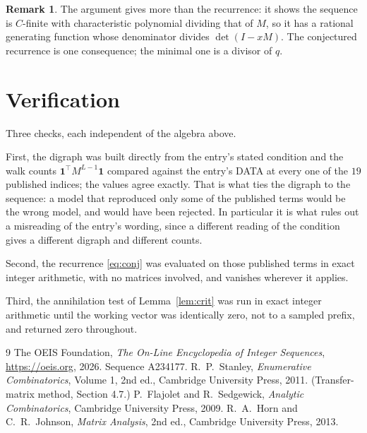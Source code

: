 \documentclass[11pt,a4paper]{article}
\theoremstyle{plain}
\theoremstyle{definition}
\newtheorem{remark}[theorem]{Remark}
\begin{document}
\begin{remark}
The argument gives more than the recurrence: it shows the sequence is $C$-finite with
characteristic polynomial dividing that of $M$, so it has a rational generating function
whose denominator divides $\det(I-xM)$. The conjectured recurrence is one consequence; the
minimal one is a divisor of $q$.
\end{remark}

\section{Verification}

Three checks, each independent of the algebra above.

First, the digraph was built directly from the entry's stated condition and the walk counts
$\mathbf{1}^{\!\top}M^{L-1}\mathbf{1}$ compared against the entry's DATA at
every one of the $19$ published indices; the values agree exactly. That is what ties
the digraph to the sequence: a model that reproduced only some of the published terms would
be the wrong model, and would have been rejected. In particular it is what rules out a
misreading of the entry's wording, since a different reading of the condition gives a
different digraph and different counts.

Second, the recurrence \eqref{eq:conj} was evaluated on those published terms in exact
integer arithmetic, with no matrices involved, and vanishes wherever it applies.

Third, the annihilation test of Lemma~\ref{lem:crit} was run in exact integer arithmetic
until the working vector was identically zero, not to a sampled prefix, and returned zero
throughout.

\begin{thebibliography}{9}
 The OEIS Foundation, \emph{The On-Line Encyclopedia of Integer
Sequences}, \url{https://oeis.org}, 2026. Sequence A234177.
 R.~P.~Stanley, \emph{Enumerative Combinatorics}, Volume 1, 2nd ed.,
Cambridge University Press, 2011. (Transfer-matrix method, Section 4.7.)
 P.~Flajolet and R.~Sedgewick, \emph{Analytic Combinatorics}, Cambridge
University Press, 2009.
 R.~A.~Horn and C.~R.~Johnson, \emph{Matrix Analysis}, 2nd ed., Cambridge
University Press, 2013.
\end{thebibliography}
\end{document}
